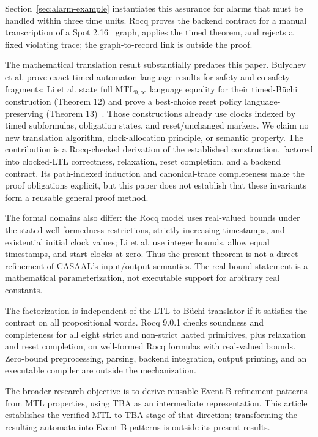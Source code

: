 \documentclass[10pt,journal,compsoc]{IEEEtran}
\begin{document}
Section~\ref{sec:alarm-example} instantiates this assurance for alarms that
must be handled within three time units. Rocq proves the backend contract for
a manual transcription of a Spot 2.16~\cite{[spot]} graph, applies the timed
theorem, and rejects a fixed violating trace; the graph-to-record link is
outside the proof.

The mathematical translation result substantially predates this paper.
Bulychev et al. prove exact timed-automaton language results for safety and
co-safety fragments; Li et al. state full MTL$_{0,\infty}$ language equality
for their timed-B\"uchi construction (Theorem 12) and prove a best-choice reset
policy language-preserving (Theorem 13)~\cite{[BDLG14],li_spin7}. Those
constructions already use clocks indexed by timed subformulas, obligation
states, and reset/unchanged markers. We claim no new translation algorithm,
clock-allocation principle, or semantic property. The contribution is a
Rocq-checked derivation of the established construction, factored into
clocked-LTL correctness, relaxation, reset completion, and a backend contract.
Its path-indexed induction and canonical-trace completeness make the proof
obligations explicit, but this paper does not establish that these invariants
form a reusable general proof method.

The formal domains also differ: the Rocq model uses real-valued bounds under
the stated well-formedness restrictions, strictly increasing timestamps, and
existential initial clock values; Li et al. use integer bounds, allow equal
timestamps, and start clocks at zero. Thus the present theorem is not a direct
refinement of CASAAL's input/output semantics. The real-bound statement is a
mathematical parameterization, not executable support for arbitrary real
constants.

The factorization is independent of the LTL-to-B\"uchi translator if it
satisfies the contract on all propositional words. Rocq 9.0.1 checks
soundness and completeness for all eight strict and non-strict hatted
primitives, plus relaxation and reset completion, on well-formed Rocq formulas
with real-valued bounds. Zero-bound preprocessing, parsing, backend
integration, output printing, and an executable compiler are outside the
mechanization.

The broader research objective is to derive reusable Event-B refinement
patterns from MTL properties, using TBA as an intermediate representation.
This article establishes the verified MTL-to-TBA stage of that direction;
transforming the resulting automata into Event-B patterns is outside its
present results.
\end{document}
